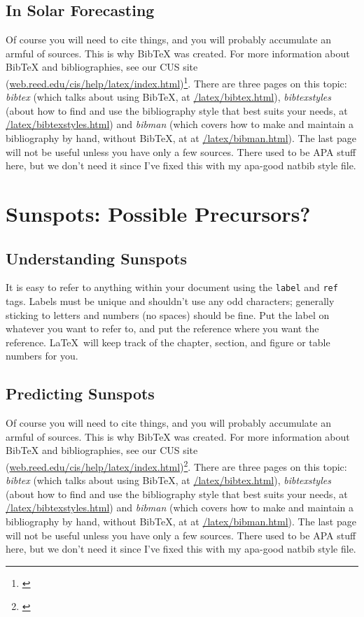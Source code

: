 \documentclass[12pt,twoside]{reedthesis}
\begin{document}
\begin{enumerate}
\begin{enumerate}
\section{In Solar Forecasting}
	Of course you will need to cite things, and you will probably accumulate an armful of sources. This is why BibTeX was created. For more information about BibTeX and bibliographies, see our CUS site (\url{web.reed.edu/cis/help/latex/index.html})\footnote{\cite{reedweb:2007}}. There are three pages on this topic: {\it bibtex} (which talks about using BibTeX, at \url{/latex/bibtex.html}), {\it bibtexstyles} (about how to find and use the bibliography style that best suits your needs, at \url{/latex/bibtexstyles.html}) and {\it bibman} (which covers how to make and maintain a bibliography by hand, without BibTeX, at at \url{/latex/bibman.html}). The last page will not be useful unless you have only a few sources. There used to be APA stuff here, but we don't need it since I've fixed this with my apa-good natbib style file.
	

\chapter{Sunspots: Possible Precursors?}	
	
\section{Understanding Sunspots}
It is easy to refer to anything within your document using the \texttt{label} and \texttt{ref} tags.  Labels must be unique and shouldn't use any odd characters; generally sticking to letters and numbers (no spaces) should be fine. Put the label on whatever you want to refer to, and put the reference where you want the reference. \LaTeX\ will keep track of the chapter, section, and figure or table numbers for you. 
	
\section{Predicting Sunspots}
	Of course you will need to cite things, and you will probably accumulate an armful of sources. This is why BibTeX was created. For more information about BibTeX and bibliographies, see our CUS site (\url{web.reed.edu/cis/help/latex/index.html})\footnote{\cite{reedweb:2007}}. There are three pages on this topic: {\it bibtex} (which talks about using BibTeX, at \url{/latex/bibtex.html}), {\it bibtexstyles} (about how to find and use the bibliography style that best suits your needs, at \url{/latex/bibtexstyles.html}) and {\it bibman} (which covers how to make and maintain a bibliography by hand, without BibTeX, at at \url{/latex/bibman.html}). The last page will not be useful unless you have only a few sources. There used to be APA stuff here, but we don't need it since I've fixed this with my apa-good natbib style file.


\end{enumerate}
\end{enumerate}
\end{document}
